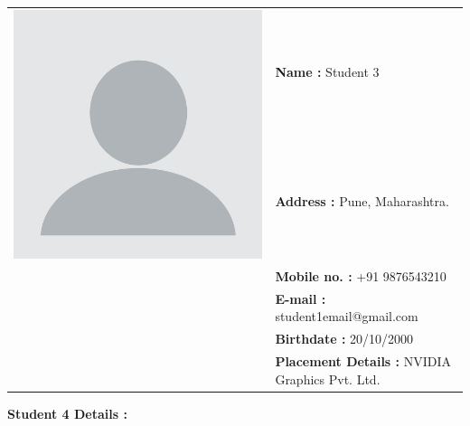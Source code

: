 \documentclass{report} %
\begin{document}
\begin{appendices}
		\centering
		\begin{tabular}{ll}
			\multirow{2}{*}{\includegraphics[scale=0.05]{images/student3.jpg}} & \textbf{Name :} Student 3 \\
			& \textbf{Address :} Pune, Maharashtra.  \\
			& \textbf{Mobile no. :} +91 9876543210  \\
			& \textbf{E-mail :} student1email@gmail.com  \\
			& \textbf{Birthdate :} 20/10/2000  \\
			& \textbf{Placement Details :} NVIDIA Graphics Pvt. Ltd.  \\
		\end{tabular}
		
		\flushleft
		\textbf{Student 4 Details :}
		\vspace{0.5cm}
		

\end{appendices}
\end{document}
